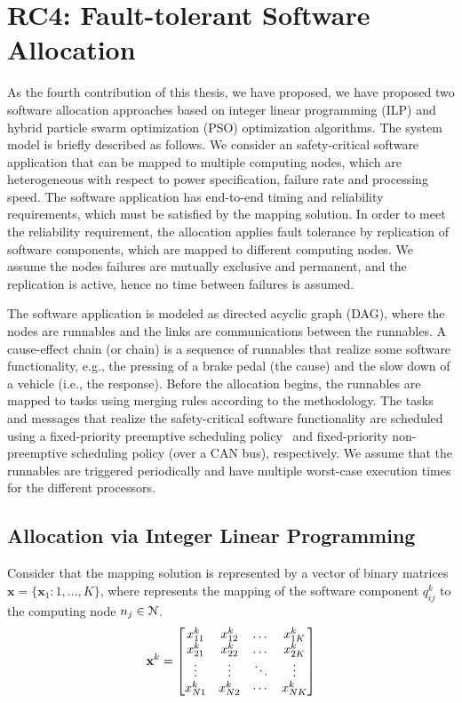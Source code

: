 \section{RC4: Fault-tolerant Software Allocation}\label{rc_ilp}
As the fourth contribution of this thesis, we have proposed, we have proposed two software allocation approaches based on integer linear programming (ILP) and hybrid  particle swarm optimization (PSO) optimization algorithms. The system model is briefly described as follows. We consider an \autosar{} safety-critical software application that can be mapped to multiple computing nodes, which are heterogeneous with respect to power specification, failure rate and processing speed. The software application has end-to-end timing and reliability requirements, which must be satisfied by the mapping solution. In order to meet the reliability requirement, the allocation applies fault tolerance by replication of software components, which are mapped to different computing nodes. We assume the nodes failures are mutually exclusive and permanent, and the replication is active, hence no time between failures is assumed.

The software application is modeled as directed acyclic graph (DAG), where the nodes are runnables and the links are communications between the runnables. A cause-effect chain (or chain) is a sequence of runnables that realize some software functionality, e.g., the pressing of a brake pedal (the cause) and the slow down of a vehicle (i.e., the response). Before the allocation begins, the runnables are mapped to tasks using merging rules according to the \autosar{} methodology. The tasks and messages that realize the safety-critical software functionality are scheduled using a fixed-priority preemptive scheduling policy~\cite{Sha2004RealPerspective} and fixed-priority non-preemptive scheduling policy (over a  CAN bus), respectively. We assume that the runnables are triggered periodically and have multiple worst-case execution times for the different processors.

\subsection*{Allocation via Integer Linear Programming}
Consider that the mapping solution is represented by a vector of binary matrices $\textbf{x}=\{\textbf{x}_1:1,...,K\}$, where \ttxkij{} represents the mapping of the software component $q^{k}_{ij}$ to the computing node $\ssb{n}[j]\in \mathcal{N}$. 
\begin{equation}
\label{eqn_solution}
\bspx{k}=
\begin{bmatrix} 
\ssx{k}{11} & \ssx{k}{12} & \dots & \ssx{k}{1K}\\
\ssx{k}{21} & \ssx{k}{22} & \dots & \ssx{k}{2K}\\
\vdots & \vdots & \ddots & \vdots\\
\ssx{k}{N1} & \ssx{k}{N2} & \cdots & \ssx{k}{NK}
\end{bmatrix}
\end{equation}

